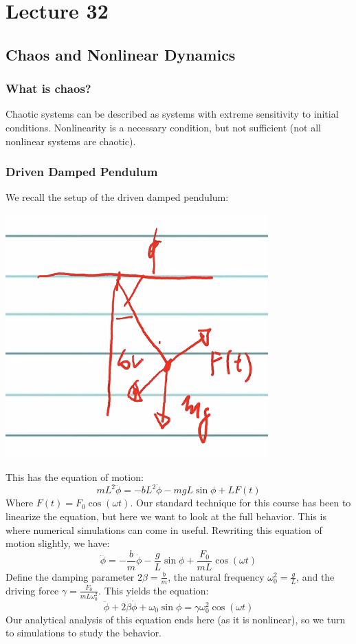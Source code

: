 \documentclass[../PHYS306Notes.tex]{subfiles}
\begin{document}
\section{Lecture 32}
\subsection{Chaos and Nonlinear Dynamics}
\subsubsection{What is chaos?}
Chaotic systems can be described as systems with extreme sensitivity to initial conditions. Nonlinearity is a necessary condition, but not sufficient (not all nonlinear systems are chaotic). 

\subsubsection{Driven Damped Pendulum}
We recall the setup of the driven damped pendulum:
\begin{center}
    \includegraphics[scale=0.7]{Lecture-32/l32-img1.png}
\end{center}
This has the equation of motion:
\[mL^2\ddot{\phi} = -bL^2\dot{\phi} - mgL\sin\phi + LF(t)\]
Where $F(t) = F_0\cos(\omega t)$. Our standard technique for this course has been to linearize the equation, but here we want to look at the full behavior. This is where numerical simulations can come in useful. Rewriting this equation of motion slightly, we have:
\[\ddot{\phi} = -\frac{b}{m}\dot{\phi} - \frac{g}{L}\sin\phi + \frac{F_0}{mL}\cos(\omega t)\]
Define the damping parameter $2\beta = \frac{b}{m}$, the natural frequency $\omega_0^2 = \frac{g}{L}$, and the driving force $\gamma = \frac{F_0}{mL\omega_0^2}$. This yields the equation:
\[\ddot{\phi} + 2\beta\dot{\phi} + \omega_0\sin\phi = \gamma \omega_0^2\cos(\omega t)\]
Our analytical analysis of this equation ends here (as it is nonlinear), so we turn to simulations to study the behavior. 
\end{document}
